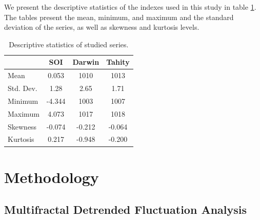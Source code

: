 \documentclass[onecolumn, preprint,aps,amsmath, amssymb, superscriptaddress]{revtex4}
\begin{document}
We present the descriptive statistics of the indexes used in this study in table \ref{tab:descriptive}. The tables present the mean, minimum, and maximum and the standard deviation of the series, as well as skewness and kurtosis levels.
\begin{table}[]
\caption{Descriptive statistics of studied series.}
\label{tab:descriptive}
\begin{tabular}{lccc}
\hline
          & SOI    & Darwin & Tahity \\ \hline
Mean      & 0.053  & 1010   & 1013   \\
Std. Dev. & 1.28   & 2.65   & 1.71   \\
Minimum   & -4.344 & 1003   & 1007   \\
Maximum   & 4.073  & 1017   & 1018   \\
Skewness  & -0.074 & -0.212 & -0.064 \\
Kurtosis  & 0.217  & -0.948 & -0.200 \\ \hline
\end{tabular}
\end{table}





\section{Methodology}
\label{sec:method}


\subsection{Multifractal Detrended Fluctuation Analysis}
\end{document}

